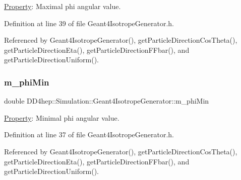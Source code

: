 \hyperlink{class_d_d4hep_1_1_property}{Property}\+: Maximal phi angular value. 



Definition at line 39 of file Geant4\+Isotrope\+Generator.\+h.



Referenced by Geant4\+Isotrope\+Generator(), get\+Particle\+Direction\+Cos\+Theta(), get\+Particle\+Direction\+Eta(), get\+Particle\+Direction\+F\+Fbar(), and get\+Particle\+Direction\+Uniform().

\hypertarget{class_d_d4hep_1_1_simulation_1_1_geant4_isotrope_generator_a87bd2c08ac991fe265d7a88d96edec48}{}\label{class_d_d4hep_1_1_simulation_1_1_geant4_isotrope_generator_a87bd2c08ac991fe265d7a88d96edec48} 
\subsubsection{\texorpdfstring{m\+\_\+phi\+Min}{m\_phiMin}}
{\footnotesize\ttfamily double D\+D4hep\+::\+Simulation\+::\+Geant4\+Isotrope\+Generator\+::m\+\_\+phi\+Min\hspace{0.3cm}{\ttfamily [protected]}}



\hyperlink{class_d_d4hep_1_1_property}{Property}\+: Minimal phi angular value. 



Definition at line 37 of file Geant4\+Isotrope\+Generator.\+h.



Referenced by Geant4\+Isotrope\+Generator(), get\+Particle\+Direction\+Cos\+Theta(), get\+Particle\+Direction\+Eta(), get\+Particle\+Direction\+F\+Fbar(), and get\+Particle\+Direction\+Uniform().

\hypertarget{class_d_d4hep_1_1_simulation_1_1_geant4_isotrope_generator_a0e42113b732249962b03bb340f69b0a6}{}\label{class_d_d4hep_1_1_simulation_1_1_geant4_isotrope_generator_a0e42113b732249962b03bb340f69b0a6} 
